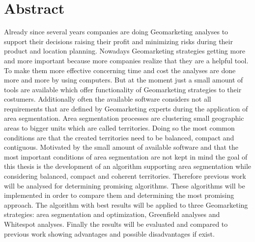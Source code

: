 \section*{Abstract}

Already since several years companies are doing Geomarketing analyses to support their decisions raising their profit and minimizing risks during their product and location planning. Nowadays Geomarketing strategies getting more and more important because more companies realize that they are a helpful tool. To make them more effective concerning time and cost the analyses are done more and more by using computers. But at the moment just a small amount of tools are available which offer functionality of Geomarketing strategies to their costumers. Additionally often the available software considers not all requirements that are defined by Geomarketing experts during the application of area segmentation. Area segmentation processes are clustering small geographic areas to bigger units which are called territories. Doing so the most common conditions are that the created territories need to be balanced, compact and contiguous.  Motivated by the small amount of available software and that the most important conditions of area segmentation are not kept in mind the goal of this thesis is the development of an algorithm supporting area segmentation while considering balanced, compact and coherent territories. Therefore previous work will be analysed for determining promising algorithms. These algorithms will be implemented in order to compare them and determining the most promising approach. The algorithm with best results will be applied to three Geomarketing strategies: area segmentation and optimization, Greenfield analyses and Whitespot analyses. Finally the results will be evaluated and compared to previous work showing advantages and possible disadvantages if exist. 